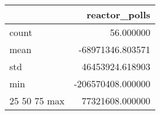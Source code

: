 \begin{tabular}{lr}
\toprule
 & reactor\_polls \\
\midrule
count & 56.000000 \\
mean & -68971346.803571 \\
std & 46453924.618903 \\
min & -206570408.000000 \\
25%
50%
75%
max & 77321608.000000 \\
\bottomrule
\end{tabular}

